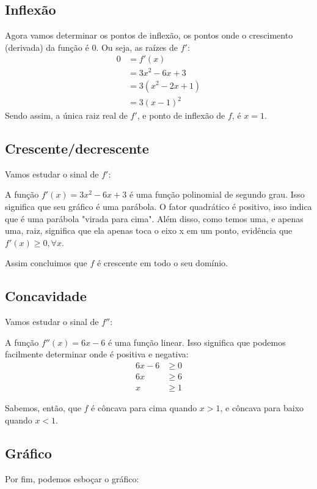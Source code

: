 \documentclass[12pt]{article}
\theoremstyle{definition}
\begin{document}
\subsection{Inflexão}
Agora vamos determinar os pontos de inflexão, os pontos onde o crescimento (derivada) da função é \(0\). Ou seja, as raízes de \(f'\):
\begin{align*}
    0 &= f'(x) \\
      &= 3x^2-6x+3 \\
      &= 3(x^2-2x+1) \\
      &= 3{(x-1)}^2
\end{align*}
Sendo assim, a única raiz real de \(f'\), e ponto de inflexão de \(f\), é \(x = 1\).
\subsection{Crescente/decrescente}
Vamos estudar o sinal de \(f'\):

A função \(f'(x) = 3x^2-6x+3\) é uma função polinomial de segundo grau. Isso significa que seu gráfico é uma parábola. O fator quadrático é positivo, isso indica que é uma parábola "virada para cima". Além disso, como temos uma, e apenas uma, raiz, significa que ela apenas toca o eixo x em um ponto, evidência que \(f'(x) \geq 0, \forall x\).

Assim concluimos que \(f\) é crescente em todo o seu domínio.
\subsection{Concavidade}
Vamos estudar o sinal de \(f''\):

A função \(f''(x) = 6x - 6\) é uma função linear. Isso significa que podemos facilmente determinar onde é positiva e negativa:
\begin{align*}
    6x - 6 &\geq 0 \\
    6x &\geq 6 \\
    x &\geq 1
\end{align*}

Sabemos, então, que \(f\) é côncava para cima quando \(x>1\), e côncava para baixo quando \(x<1\).
\subsection{Gráfico}
Por fim, podemos esboçar o gráfico:

\end{document}
